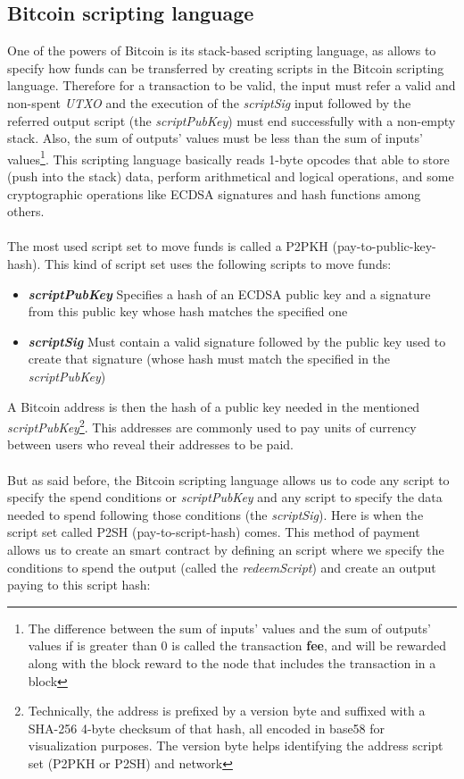 \documentclass[12pt,journal,compsoc]{IEEEtran}
\begin{document}
\subsection{Bitcoin scripting language}
One of the powers of Bitcoin is its stack-based scripting language, as allows to specify how funds can be transferred by creating scripts in the Bitcoin scripting language\cite{bitcoin-wiki-script:online}. Therefore for a transaction to be valid, the input must refer a valid and non-spent \textit{UTXO} and the execution of the \textit{scriptSig} input followed by the referred output script (the \textit{scriptPubKey}) must end successfully with a non-empty stack. Also, the sum of outputs' values must be less than the sum of inputs' values\footnote{The difference between the sum of inputs' values and the sum of outputs' values if is greater than 0 is called the transaction \textbf{fee}, and will be rewarded along with the block reward to the node that includes the transaction in a block}. This scripting language basically reads 1-byte opcodes that able to store (push into the stack) data, perform arithmetical and logical operations, and some cryptographic operations like ECDSA signatures and hash functions among others. \\\\
The most used script set to move funds is called a P2PKH (pay-to-public-key-hash). This kind of script set uses the following scripts to move funds:
\begin{itemize}
    \item \textbf{\textit{scriptPubKey}} Specifies a hash of an ECDSA public key and a signature from this public key whose hash matches the specified one
    \item \textbf{\textit{scriptSig}} Must contain a valid signature followed by the public key used to create that signature (whose hash must match the specified in the \textit{scriptPubKey})
\end{itemize}
A Bitcoin address is then the hash of a public key needed in the mentioned \textit{scriptPubKey}\footnote{Technically, the address is prefixed by a version byte and suffixed with a SHA-256 4-byte checksum of that hash, all encoded in base58 for visualization purposes. The version byte helps identifying the address script set (P2PKH or P2SH) and network}. This addresses are commonly used to pay units of currency between users who reveal their addresses to be paid.\\\\
But as said before, the Bitcoin scripting language allows us to code any script to specify the spend conditions or \textit{scriptPubKey} and any script to specify the data needed to spend following those conditions (the \textit{scriptSig}). Here is when the script set called P2SH (pay-to-script-hash) comes. This method of payment allows us to create an smart contract by defining an script where we specify the conditions to spend the output (called the \textit{redeemScript}) and create an output paying to this script hash:
\end{document}
